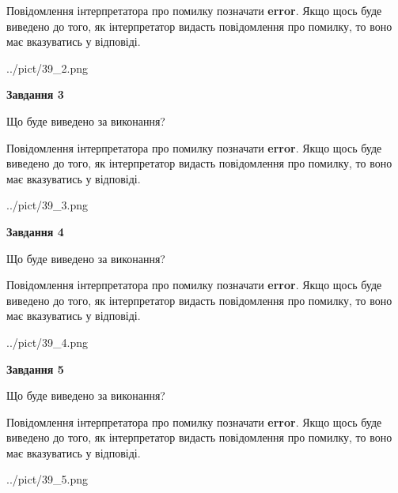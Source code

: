 \documentclass[12pt, ukrainian]{article}
\begin{document}
{\begin {large}
Повідомлення інтерпретатора про помилку позначати \textbf{error}.
Якщо щось буде виведено до того, як інтерпретатор видасть повідомлення про помилку, 
то воно має вказуватись у відповіді. \par


\begin{center}
	{../pict/39_2.png}
\end{center}
\newpage

{\begin {center}\textbf{Завдання 3}\end {center}}\par
Що буде виведено за виконання?

Повідомлення інтерпретатора про помилку позначати \textbf{error}.
Якщо щось буде виведено до того, як інтерпретатор видасть повідомлення про помилку, 
то воно має вказуватись у відповіді. \par


\begin{center}
	{../pict/39_3.png}
\end{center}
\newpage

{\begin {center}\textbf{Завдання 4}\end {center}}\par
Що буде виведено за виконання?

Повідомлення інтерпретатора про помилку позначати \textbf{error}.
Якщо щось буде виведено до того, як інтерпретатор видасть повідомлення про помилку, 
то воно має вказуватись у відповіді. \par


\begin{center}
	{../pict/39_4.png}
\end{center}
\newpage

{\begin {center}\textbf{Завдання 5}\end {center}}\par
Що буде виведено за виконання?

Повідомлення інтерпретатора про помилку позначати \textbf{error}.
Якщо щось буде виведено до того, як інтерпретатор видасть повідомлення про помилку, 
то воно має вказуватись у відповіді. \par


\begin{center}
	{../pict/39_5.png}
\end{center}
\newpage


\end{large}}
\end{document}
